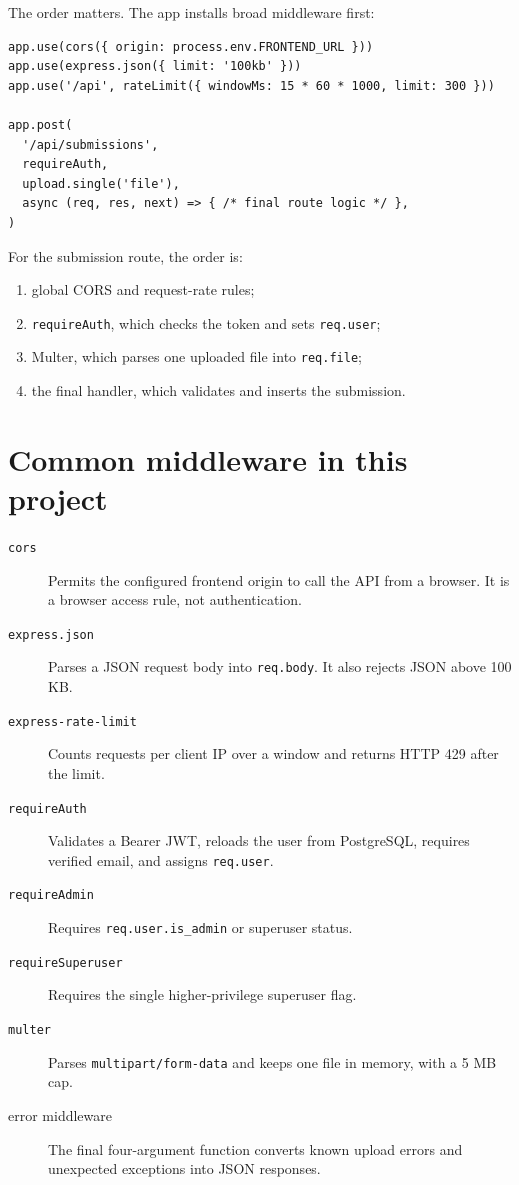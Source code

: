 \documentclass[11pt,oneside]{book}
\newcommand{\code}[1]{\texttt{#1}}
\begin{document}
The order matters. The app installs broad middleware first:

\begin{lstlisting}[title={server/index.js, simplified}]
app.use(cors({ origin: process.env.FRONTEND_URL }))
app.use(express.json({ limit: '100kb' }))
app.use('/api', rateLimit({ windowMs: 15 * 60 * 1000, limit: 300 }))

app.post(
  '/api/submissions',
  requireAuth,
  upload.single('file'),
  async (req, res, next) => { /* final route logic */ },
)
\end{lstlisting}

For the submission route, the order is:
\begin{enumerate}
  \item global CORS and request-rate rules;
  \item \code{requireAuth}, which checks the token and sets \code{req.user};
  \item Multer, which parses one uploaded file into \code{req.file};
  \item the final handler, which validates and inserts the submission.
\end{enumerate}

\section{Common middleware in this project}
\begin{description}
  \item[\code{cors}] Permits the configured frontend origin to call the API from a browser. It is a browser access rule, not authentication.
  \item[\code{express.json}] Parses a JSON request body into \code{req.body}. It also rejects JSON above 100 KB.
  \item[\code{express-rate-limit}] Counts requests per client IP over a window and returns HTTP 429 after the limit.
  \item[\code{requireAuth}] Validates a Bearer JWT, reloads the user from PostgreSQL, requires verified email, and assigns \code{req.user}.
  \item[\code{requireAdmin}] Requires \code{req.user.is\_admin} or superuser status.
  \item[\code{requireSuperuser}] Requires the single higher-privilege superuser flag.
  \item[\code{multer}] Parses \code{multipart/form-data} and keeps one file in memory, with a 5 MB cap.
  \item[error middleware] The final four-argument function converts known upload errors and unexpected exceptions into JSON responses.
\end{description}
\end{document}

